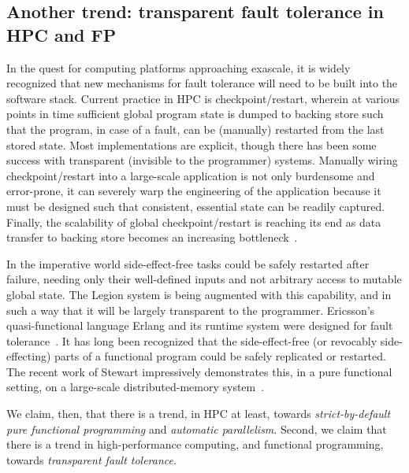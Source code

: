 \documentclass{llncs}
\begin{document}
\subsection{Another trend: transparent fault tolerance in HPC and FP}
In the quest for computing platforms approaching exascale, it is widely
recognized that new mechanisms for fault tolerance will need to be built into
the software stack.  Current practice in HPC is checkpoint/restart, wherein at
various points in time sufficient global program state is dumped to backing store
such that the program, in case of a fault, can be (manually) restarted from
the last stored state.  Most implementations are explicit, though there has
been some success with transparent (invisible to the programmer) systems.
Manually wiring checkpoint/restart into a large-scale application is not only
burdensome and error-prone, it can severely warp the engineering of the
application because it must be designed such that consistent, essential state
can be readily captured.  Finally, the scalability of global
checkpoint/restart is reaching its end as data transfer to backing store
becomes an increasing bottleneck~\cite{Daly:2006,DOE:2009}.

In the imperative world side-effect-free tasks could be safely restarted after
failure, needing only their well-defined inputs and not arbitrary access to
mutable global state.  The Legion system is being augmented with this
capability, and in such a way that it will be largely transparent to the
programmer.  Ericsson's quasi-functional language Erlang and its runtime
system were designed for fault tolerance~\cite{Cesarini:2009}.  It has long
been recognized that the side-effect-free (or revocably side-effecting)
parts of a functional program could be safely replicated or restarted.  The
recent work of Stewart impressively demonstrates this, in a pure functional
setting, on a large-scale distributed-memory system~\cite{Stewart:2013}.

We claim, then, that there is a trend, in HPC at least, towards
\emph{strict-by-default pure functional programming} and \emph{automatic
parallelism}.
Second, we claim that there is a trend in high-performance computing, and
functional programming, towards \emph{transparent fault tolerance}.

\end{document}
